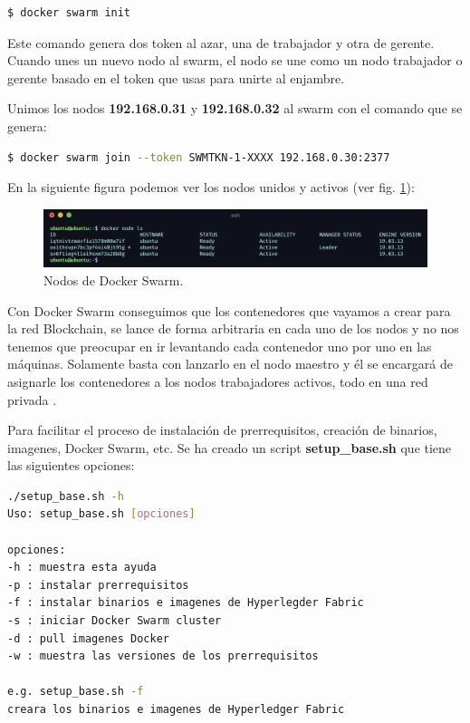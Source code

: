\begin{lstlisting}[language=bash]
  $ docker swarm init
\end{lstlisting}

\noindent Este comando genera dos token al azar, una de trabajador y otra de gerente. Cuando unes un nuevo nodo al 
swarm, el nodo se une como un nodo trabajador o gerente basado en el token que usas para unirte al enjambre.

\vspace{5mm}

\noindent Unimos los nodos \textbf{192.168.0.31} y \textbf{192.168.0.32} al swarm con el comando que se genera: 

\begin{lstlisting}[language=bash]
  $ docker swarm join --token SWMTKN-1-XXXX 192.168.0.30:2377
\end{lstlisting}

\newpage

\noindent En la siguiente figura podemos ver los nodos unidos y activos (ver fig. \ref{fig:node-ls-worker}):

\begin{figure}[ht!]
  \centering
  \includegraphics[width=\textwidth]{imagenes/desarrollo/comandos/node_ls_worker}
  \caption{Nodos de Docker Swarm.}
  \label{fig:node-ls-worker}
\end{figure}

\noindent Con Docker Swarm conseguimos que los contenedores que vayamos a crear para la red Blockchain, se lance de forma 
arbitraria en cada uno de los nodos y no nos tenemos que preocupar en ir levantando cada contenedor uno por uno
en las máquinas. Solamente basta con lanzarlo en el nodo maestro y él se encargará de asignarle los contenedores
a los nodos trabajadores activos, todo en una red privada \cite{hyperledger-fabric-rasp-swarm}.

\vspace{5mm}

\noindent Para facilitar el proceso de instalación de prerrequisitos, creación de binarios, imagenes, Docker Swarm, etc. 
Se ha creado un script \textbf{setup\_base.sh} que tiene las siguientes opciones:

\begin{lstlisting}[language=bash]
./setup_base.sh -h
Uso: setup_base.sh [opciones]

opciones:
-h : muestra esta ayuda
-p : instalar prerrequisitos
-f : instalar binarios e imagenes de Hyperlegder Fabric
-s : iniciar Docker Swarm cluster
-d : pull imagenes Docker
-w : muestra las versiones de los prerrequisitos

e.g. setup_base.sh -f
creara los binarios e imagenes de Hyperledger Fabric
\end{lstlisting}

